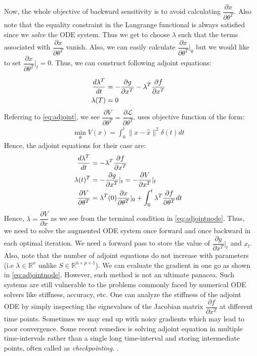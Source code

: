\documentclass[fontsize=11pt]{article}
\newcommand{\R}{\mathbb{R}}
\newcommand{\norm}[1]{\lVert #1 \rVert}
\theoremstyle{definition}
\begin{document}
Now, the whole objective of backward sensitivity is to avoid calculating $\dfrac{\partial x}{\partial \theta^T}$.
Also note that the equality constraint in the Langrange functional is always satisfied
since we \textit{solve} the ODE system. Thus we get to choose $\lambda$ such that the terms
associated with $\dfrac{\partial x}{\partial \theta^T}$ vanish. Also, we can 
easily calculate $\dfrac{\partial x}{\partial \theta^T}|_0$ but we would like to set
$\dfrac{\partial x}{\partial \theta^T}|_t = 0$. Thus, we can construct following adjoint 
equations:

\begin{align}
    \dfrac{d\lambda^T}{dt} &= -\dfrac{\partial g}{\partial x^T} - \lambda^T \dfrac{\partial f}{\partial x^T} \notag \\
    \lambda(T) &= 0
\end{align}
Referring to \cref{eq:adjoint}, we see $\dfrac{\partial V}{\partial \theta^T} = 
\dfrac{\partial \mathcal{L}}{\partial \theta^T}$.
\cite{chen:rubanova:bettencourt:duvenaud:2018} uses objective function of the form:
\begin{align}
    \min\limits_{\theta}V(x) = \int_0^t \norm{x - \hat{x}}^2 \delta(t) dt
\end{align}
Hence, the adjoint equations for their case are:
\begin{align}
    \dfrac{d\lambda^T}{dt} &= -\lambda^T \dfrac{\partial f}{\partial x^T} \notag \\
    \lambda(t)^T &= - \dfrac{\partial g}{\partial x^T}|_t = -\dfrac{\partial V}{\partial x^T}|_t \notag \\
    \dfrac{\partial V}{\partial \theta^T} &= \lambda^T(0)\dfrac{\partial x}{\partial \theta^T}|_0 + \int_0^t   \lambda^T \dfrac{\partial f}{\partial \theta^T} dt
    \label{eq:adjointnode}
\end{align}
Hence, $\lambda = \dfrac{\partial V}{\partial x}$ as we see from the terminal 
condition in \cref{eq:adjointnode}.
Thus, we need to solve the augmented ODE system once forward 
and once backward in each optimal iteration. We need a forward pass to store
the value of $\dfrac{\partial g}{\partial x^T}|_t$ and $x_t$. Also, note that the number 
of adjoint equations do not increase with parameters (i.e $\lambda \in \R^n$ unlike $S \in \R^{n \times p+1}$). 
We can evaluate the gradient in one go as shown in \cref{eq:adjointnode}. 
However, such method is not 
an ultimate panacea. Such systems are still vulnerable to the problems commonly faced by
numerical ODE solvers like stiffness, accuracy, etc. One can analyze the stiffness
of the adjoint ODE by simply inspecting the eignevalues of the Jacobian matrix $\dfrac{\partial f}{\partial x^T}$
at different time points. Sometimes we may end up with noisy gradients which may lead to poor convergence.
Some recent remedies is solving adjoint equation in multiple time-intervals rather than 
a single long time-interval
and storing intermediate points, often called as \textit{checkpointing}.
 \citep{zhuang:dvornek:li:tatikonda:papademetris:duncan:2020}. 
\end{document}
